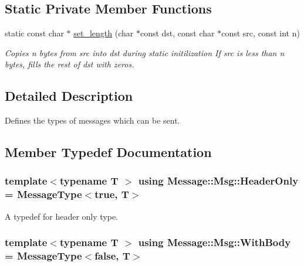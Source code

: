 \subsection*{Static Private Member Functions}
\begin{DoxyCompactItemize}
\item 
static const char $\ast$ \hyperlink{class_message_1_1_msg_adacbbaadf7d1f920e837d07d3dd39725}{set\+\_\+length} (char $\ast$const dst, const char $\ast$const src, const int n)
\begin{DoxyCompactList}\small\item\em Copies n bytes from src into dst during static initilization If src is less than n bytes, fills the rest of dst with zeros. \end{DoxyCompactList}\end{DoxyCompactItemize}


\subsection{Detailed Description}
Defines the types of messages which can be sent. 

\subsection{Member Typedef Documentation}
\subsubsection[{\texorpdfstring{Header\+Only}{HeaderOnly}}]{\setlength{\rightskip}{0pt plus 5cm}template$<$typename T $>$ using {\bf Message\+::\+Msg\+::\+Header\+Only} =  {\bf Message\+Type}$<$true, T$>$}\hypertarget{class_message_1_1_msg_a56cc5b2c5d898b85e97b1f3a46ab3999}{}\label{class_message_1_1_msg_a56cc5b2c5d898b85e97b1f3a46ab3999}


A typedef for header only type. 

\subsubsection[{\texorpdfstring{With\+Body}{WithBody}}]{\setlength{\rightskip}{0pt plus 5cm}template$<$typename T $>$ using {\bf Message\+::\+Msg\+::\+With\+Body} =  {\bf Message\+Type}$<$false, T$>$}\hypertarget{class_message_1_1_msg_a385691f2f7fc10f0b4c1544b8892a6c9}{}\label{class_message_1_1_msg_a385691f2f7fc10f0b4c1544b8892a6c9}


